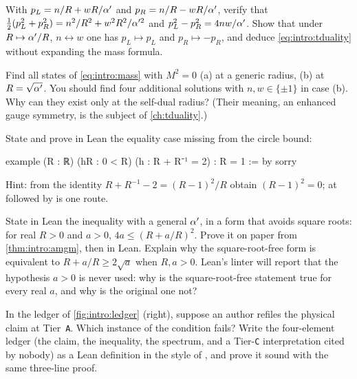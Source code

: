 \begin{exercise}[$\star$]\label{exr:intro:plpr}
With $p_{L}=n/R+wR/\alpha'$ and $p_{R}=n/R-wR/\alpha'$, verify that
$\tfrac12(p_L^2+p_R^2)=n^2/R^2+w^2R^2/\alpha'^2$ and $p_L^2-p_R^2=4nw/\alpha'$. Show that under
$R\mapsto\alpha'/R$, $n\leftrightarrow w$ one has $p_L\mapsto p_L$ and $p_R\mapsto-p_R$, and deduce
\eqref{eq:intro:tduality} without expanding the mass formula.
\end{exercise}

\begin{exercise}[$\star\star$]\label{exr:intro:massless}
Find all states of \eqref{eq:intro:mass} with $M^2=0$ (a) at a generic radius, (b) at
$R=\sqrt{\alpha'}$. You should find four additional solutions with $n,w\in\{\pm1\}$ in case (b).
Why can they exist only at the self-dual radius? (Their meaning, an enhanced gauge symmetry,
is the subject of \cref{ch:tduality}.)
\end{exercise}

\begin{exercise}[$\star\star$]\label{exr:intro:eq}
State and prove in Lean the equality case missing from the circle bound:
\begin{leancode}
example (R : ℝ) (hR : 0 < R) (h : R + R⁻¹ = 2) : R = 1 := by
  sorry
\end{leancode}
Hint: from the identity $R+R^{-1}-2=(R-1)^2/R$ obtain $(R-1)^2=0$;  at
 followed by  is one route.
\end{exercise}

\begin{exercise}[$\star\star$]\label{exr:intro:alpha}
State in Lean the inequality with a general $\alpha'$, in a form that avoids square roots:
for real $R>0$ and $a>0$, $4a\le(R+a/R)^2$. Prove it on paper from \cref{thm:intro:amgm}, then
in Lean. Explain why the square-root-free form is equivalent to $R+a/R\ge2\sqrt a$ when
$R,a>0$. Lean's linter will report that the hypothesis $a>0$ is never used: why is the
square-root-free statement true for every real $a$, and why is the original one not?
\end{exercise}

\begin{exercise}[$\star\star$]\label{exr:intro:ledger}
In the ledger of \cref{fig:intro:ledger} (right), suppose an author refiles the physical claim
at Tier~\texttt{A}. Which instance of the condition  fails? Write the four-element
ledger (the claim, the inequality, the spectrum, and a Tier-\texttt{C} interpretation cited by
nobody) as a Lean definition  in the style of , and
prove it sound with the same three-line proof.
\end{exercise}

